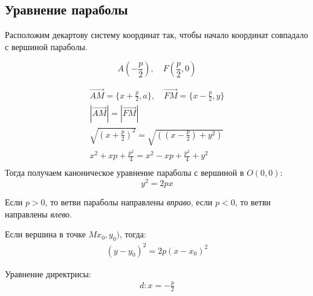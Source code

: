 \subsection*{Уравнение параболы}

Расположим декартову систему координат так, чтобы начало координат совпадало с вершиной параболы.

\[
A(-\frac{p}{2}), \quad F(\frac{p}{2}, 0)
\] 

\begin{gather*}
  \overrightarrow{AM} = \{x + \frac{p}{2}, a\}, \quad \overrightarrow{FM} = \{x - \frac{p}{2}, y\} \\
  |\overrightarrow{AM}| = |\overrightarrow{FM}| \\
  \sqrt{\left( x + \frac{p}{2} \right)^2 } = \sqrt{\left( (x - \frac{p}{2}) + y^2 \right)} \\
  x^2 + xp + \frac{p^2}{4} = x^2 - xp + \frac{p^2}{4} + y^2 \\
\end{gather*}
Тогда получаем каноническое уравнение параболы с вершиной в $O(0, 0)$:  \[
  \boxed{y^2 = 2px}
\] 

Если $p > 0$, то ветви параболы направлены \textit{вправо}, если  $p < 0$, то ветви направлены  \textit{влево}.

Если вершина в точке $Mx_0, y_0)$, тогда: 
\begin{gather*}
  (y - y_0)^2 = 2p(x - x_0)^2
\end{gather*}

Уравнение директрисы:
\begin{gather*}
  d: x = -\frac{p}{2}
\end{gather*}

